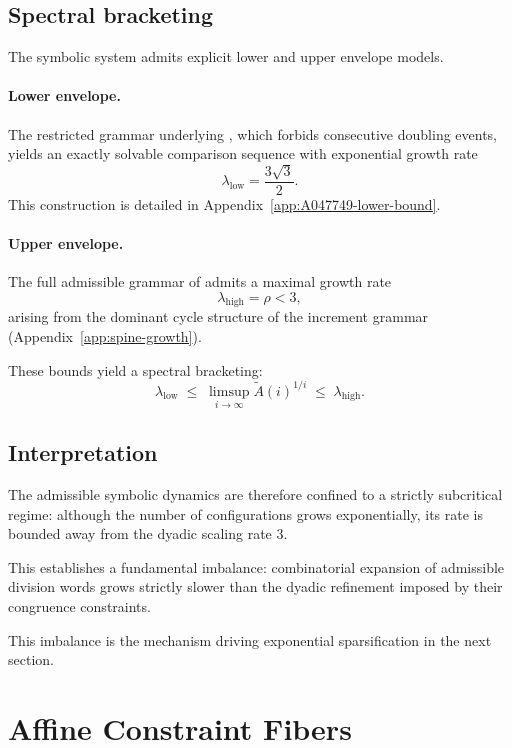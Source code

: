 \documentclass[12pt, oneside]{article}
\numberwithin{equation}{section}
\theoremstyle{definition}
\theoremstyle{plain}
\theoremstyle{remark}
\begin{document}
\subsection{Spectral bracketing}

The symbolic system admits explicit lower and upper envelope models.

\paragraph{Lower envelope.}
The restricted grammar underlying , which forbids consecutive
doubling events, yields an exactly solvable comparison sequence with
exponential growth rate
\[
\lambda_{\mathrm{low}} = \frac{3\sqrt{3}}{2}.
\]
This construction is detailed in Appendix~\ref{app:A047749-lower-bound}.

\paragraph{Upper envelope.}
The full admissible grammar of  admits a maximal growth rate
\[
\lambda_{\mathrm{high}} = \rho < 3,
\]
arising from the dominant cycle structure of the increment grammar
(Appendix~\ref{app:spine-growth}).

\medskip

\noindent
These bounds yield a spectral bracketing:
\[
\lambda_{\mathrm{low}}
\;\le\;
\limsup_{i\to\infty} \widetilde A(i)^{1/i}
\;\le\;
\lambda_{\mathrm{high}}.
\]

\subsection*{Interpretation}

The admissible symbolic dynamics are therefore confined to a strictly
subcritical regime: although the number of configurations grows exponentially,
its rate is bounded away from the dyadic scaling rate $3$.

This establishes a fundamental imbalance: combinatorial expansion of admissible
division words grows strictly slower than the dyadic refinement imposed by their
congruence constraints.

This imbalance is the mechanism driving exponential sparsification in the next section.

\section{Affine Constraint Fibers}
\label{sec:affine-constraint-fibers}
\end{document}
